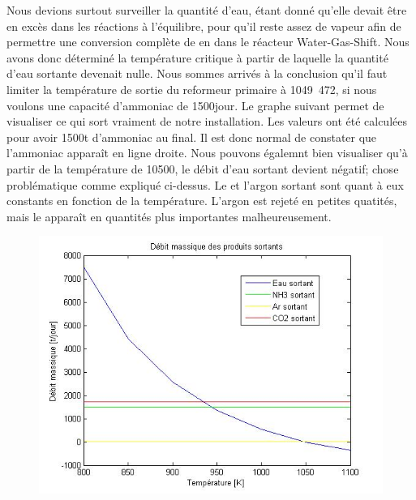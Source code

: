 \newpage
Nous devions surtout surveiller la quantité d'eau, étant donné qu'elle devait être en excès dans les réactions à
l'équilibre, pour qu'il reste assez de vapeur afin de permettre une conversion complète de  en  dans le
réacteur Water-Gas-Shift.
Nous avons donc déterminé la température critique à partir de laquelle la quantité d'eau sortante devenait nulle.
Nous sommes arrivés à la conclusion qu'il faut limiter la température de sortie du reformeur primaire à
\unit{1049.472}{\kelvin}, si nous voulons une capacité d'ammoniac de \unit{1500}{\ton\per jour}.
Le graphe suivant permet de visualiser ce qui sort vraiment de notre installation. Les valeurs ont été calculées pour
avoir 1500t d'ammoniac au final. Il est donc normal de constater que l'ammoniac apparaît en ligne droite.
Nous pouvons égalemnt bien visualiser qu'à partir de la température de \unit{10500}{\kelvin}, le débit d'eau sortant devient
négatif; chose problématique comme expliqué ci-dessus.
Le  et l'argon sortant sont quant à eux constants en fonction de la température. L'argon est rejeté en petites quatités, mais le 
apparaît en quantités plus importantes malheureusement.
\begin{figure}[ht!]
\centering
\includegraphics[scale=0.6]{produits.jpg}
\label{produits_sortants}
\end{figure}
